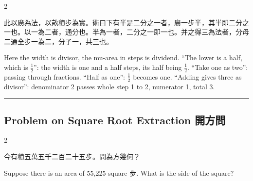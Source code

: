 \documentclass[10pt,a4paper]{article}
\newcommand{\longline}{\noindent\rule{\textwidth}{0.4pt}}
\begin{document}
\begin{paracol}{2}

\begin{leftcolumn*}
\begin{commentarybi}
此以廣為法，以畝積步為實。術曰下有半是二分之一者，廣一步半，其半即二分之一也。以一為二者，通分也。半為一者，二分之一即一也。并之得三為法者，分母二通全步一為二，分子一，共三也。
\end{commentarybi}
\end{leftcolumn*}

\begin{rightcolumn*}
\begin{commentarybi}
Here the width is divisor, the mu-area in steps is dividend. ``The lower is a half, which is $\frac{1}{2}$'': the width is one and a half steps, its half being $\frac{1}{2}$. ``Take one as two'': passing through fractions. ``Half as one'': $\frac{1}{2}$ becomes one. ``Adding gives three as divisor'': denominator 2 passes whole step 1 to 2, numerator 1, total 3.
\end{commentarybi}
\end{rightcolumn*}

\end{paracol}

\vspace{0.3cm}
\longline
\vspace{0.3cm}

\subsection{Problem on Square Root Extraction 開方問}

\begin{paracol}{2}

\begin{leftcolumn*}
\begin{problembi}[\textbf{問} · 開方]
今有積五萬五千二百二十五步。問為方幾何？
\end{problembi}
\end{leftcolumn*}

\begin{rightcolumn*}
\begin{problembi}
Suppose there is an area of 55,225 square 步. What is the side of the square?
\end{problembi}
\end{rightcolumn*}

\end{paracol}
\end{document}
